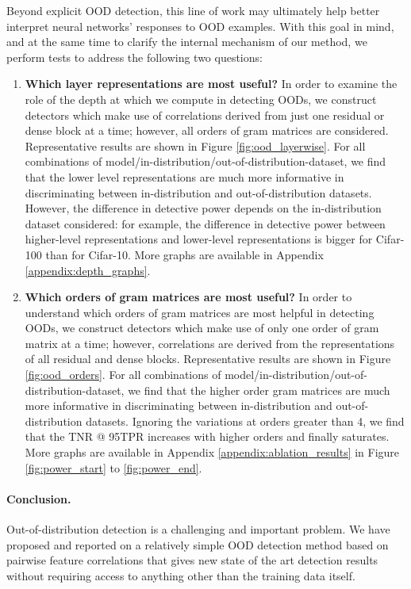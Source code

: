\documentclass{article}
\begin{document}
Beyond explicit OOD detection, this line of work may ultimately help better interpret neural networks' responses to OOD examples. With this goal in mind, and at the same time to clarify the internal mechanism of our method, we perform tests to address the following two questions:
\begin{enumerate}
    \item \textbf{Which layer representations are most useful?} In order to examine the role of the depth at which we compute  in detecting OODs, we construct detectors which make use of correlations derived from just one residual or dense block at a time; however, all orders of gram matrices are considered. Representative results are shown in Figure \ref{fig:ood_layerwise}. For all combinations of model/in-distribution/out-of-distribution-dataset, we find that the lower level representations are much more informative in discriminating between in-distribution and out-of-distribution datasets. However, the difference in detective power depends on the in-distribution dataset considered: for example, the difference in detective power between higher-level representations and lower-level representations is bigger for Cifar-100 than for Cifar-10. More graphs are available in Appendix \ref{appendix:depth_graphs}.

    \item \textbf{Which orders of gram matrices are most useful?} In order to understand which orders of gram matrices are most helpful in detecting OODs, we construct detectors which make use of only one order of gram matrix at a time; however, correlations are derived from the representations of all residual and dense blocks. Representative results are shown in Figure \ref{fig:ood_orders}. For all combinations of model/in-distribution/out-of-distribution-dataset, we find that the higher order gram matrices are much more informative in discriminating between in-distribution and out-of-distribution datasets. Ignoring the variations at orders greater than 4, we find that the TNR @ 95TPR increases with higher orders and finally saturates. More graphs are available in Appendix \ref{appendix:ablation_results} in Figure \ref{fig:power_start} to \ref{fig:power_end}.
\end{enumerate}

\paragraph{Conclusion.} Out-of-distribution detection is a challenging and important problem. We have proposed and reported on a relatively simple OOD detection method based on pairwise feature correlations that gives new state of the art detection results without requiring access to anything other than the training data itself.
\end{document}
